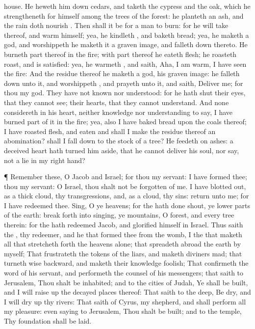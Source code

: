 {house.
He heweth him
down
cedars, and
taketh the
cypress and the
oak, which he
strengtheneth for himself among the
trees of the
forest: he
planteth an
ash, and the
rain doth
nourish
{}.
Then shall it be for a
man to
burn: for he will
take thereof, and
warm himself; yea, he
kindleth
{}, and
baketh
bread; yea, he
maketh a
god, and
worshippeth
{} he
maketh it a graven
image, and falleth
down thereto.
He
burneth
part thereof
in the
fire; with
part thereof he
eateth
flesh; he
roasteth
roast, and is
satisfied: yea, he
warmeth
{}, and
saith,
Aha, I am
warm, I have
seen the
fire:
And the
residue thereof he
maketh a
god,
{} his graven
image: he falleth
down unto it, and
worshippeth
{}, and
prayeth unto it, and
saith,
Deliver me; for thou
{} my
god.
They have not
known nor
understood: for he hath
shut their
eyes, that they cannot
see;
{} their
hearts, that they cannot
understand.
And none
considereth in his
heart, neither
{}
knowledge nor
understanding to
say, I have
burned
part of it
in the
fire; yea, also I have
baked
bread upon the
coals thereof; I have
roasted
flesh, and
eaten
{} and shall I
make the
residue thereof an
abomination? shall I fall
down to the
stock of a
tree?
He
feedeth on
ashes: a
deceived
heart hath turned him
aside, that he cannot
deliver his
soul, nor
say,
{} not a
lie in my right
hand?
\par }{\PP {}¶
Remember these, O
Jacob and
Israel; for thou
{} my
servant: I have
formed thee; thou
{} my
servant: O
Israel, thou shalt not be
forgotten of me.
I have blotted
out, as a thick
cloud, thy
transgressions, and, as a
cloud, thy
sins:
return unto me; for I have
redeemed thee.
Sing, O ye
heavens; for the
{} hath
done
{}
shout, ye lower
parts of the
earth: break
forth into
singing, ye
mountains, O
forest, and every
tree therein: for the
{} hath
redeemed
Jacob, and
glorified himself in
Israel.
Thus
saith the
{}, thy
redeemer, and he that
formed thee from the
womb, I
{} the
{} that
maketh all
{} that stretcheth
forth the
heavens alone; that spreadeth
abroad the
earth by myself;
That
frustrateth the
tokens of the
liars, and maketh
diviners
mad; that
turneth
wise
{}
backward, and maketh their
knowledge
foolish;
That
confirmeth the
word of his
servant, and
performeth the
counsel of his
messengers; that
saith to
Jerusalem, Thou shalt be
inhabited; and to the
cities of
Judah, Ye shall be
built, and I will raise
up the decayed
places thereof:
That
saith to the
deep, Be
dry, and I will dry
up thy
rivers:
That
saith of
Cyrus,
{} my
shepherd, and shall
perform all my
pleasure: even
saying to
Jerusalem, Thou shalt be
built; and to the
temple, Thy foundation shall be
laid.

}
